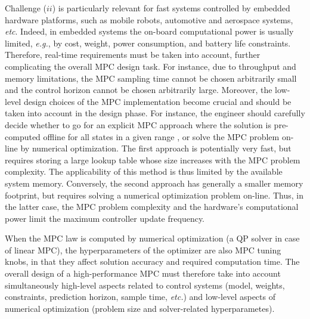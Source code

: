 \documentclass{article}
\begin{document}
Challenge ($ii$) is particularly relevant for fast systems controlled by embedded hardware platforms, such as mobile robots, automotive and aerospace systems, \emph{etc}. Indeed, in embedded systems the on-board computational power is usually limited, \emph{e.g.}, by cost, weight, power consumption, and battery life constraints. Therefore, real-time requirements must be taken into account, further complicating the overall MPC design task.  For instance, due to throughput and memory limitations, the MPC sampling time  cannot be chosen arbitrarily small and the control horizon cannot be chosen arbitrarily large.
Moreover, the low-level design choices of the MPC implementation become crucial and should be taken into account in the design phase. For instance, the engineer should carefully decide whether to go for an explicit MPC approach where the solution is pre-computed offline for all states in a given range \citep{bemporad2002explicit}, or solve the MPC problem on-line by numerical optimization. The first approach is potentially very fast, but requires storing a large lookup table whose size increases with the MPC problem complexity. The applicability of this method is thus limited by the available system memory. Conversely, the second approach has generally a smaller memory footprint, but requires solving a numerical optimization problem on-line. Thus, in the latter case, the MPC problem complexity and the hardware's computational power limit the maximum controller update frequency. 


When the MPC law is computed by numerical optimization (a QP solver in case of linear MPC), the hyperparameters of the optimizer are also MPC tuning knobs, in that they affect solution accuracy and required computation time. 
The overall design of a high-performance MPC must therefore take into account simultaneously high-level aspects related to control systems (model, weights, constraints, prediction horizon, sample time, \emph{etc.})  and low-level aspects of numerical optimization (problem size and solver-related hyperparametes). 
\end{document}

